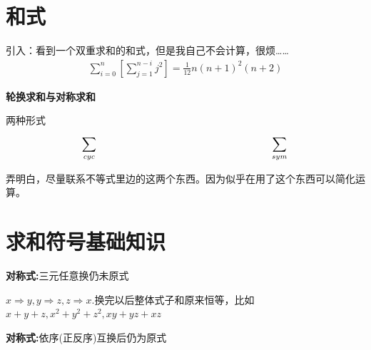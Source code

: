 \documentclass[fontset=windows]{article}
\begin{document}
    \section{和式}
    引入：看到一个双重求和的和式，但是我自己不会计算，很烦……
    \begin{align*}
        \sum _{i=0}^n \left[\sum _{j=1}^{n-i} j^2\right]=\frac{1}{12} n (n+1)^2 (n+2)
    \end{align*}
    
    \textbf{轮换求和与对称求和}

    两种形式
    \[\sum_{cyc}^{}{}\hspace*{0.5\linewidth}\sum_{ sym}^{}{}\]

    弄明白，尽量联系不等式里边的这两个东西。因为似乎在用了这个东西可以简化运算。

    \section*{求和符号基础知识}
    \textbf{对称式:}三元任意换仍未原式


    $x\Rightarrow y, y\Rightarrow z, z\Rightarrow x$.换完以后整体式子和原来恒等，比如$x+y+z, x^2 + y^2 + z^2, xy + yz + xz$ 

    \textbf{对称式:}依序(正反序)互换后仍为原式
\end{document}
